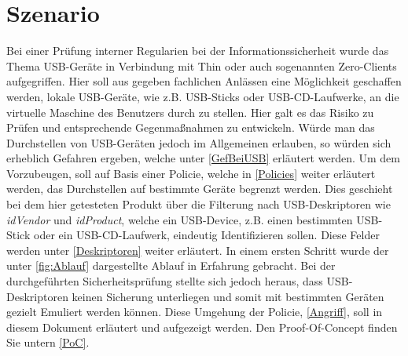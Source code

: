 			\chapter{Szenario}
Bei einer Prüfung interner Regularien bei der Informationssicherheit wurde das Thema USB-Geräte in Verbindung mit Thin oder auch sogenannten Zero-Clients aufgegriffen. Hier soll aus gegeben fachlichen Anlässen eine Möglichkeit geschaffen werden, lokale USB-Geräte, wie z.B. USB-Sticks oder USB-CD-Laufwerke, an die virtuelle Maschine des Benutzers durch zu stellen. Hier galt es das Risiko zu Prüfen und entsprechende Gegenmaßnahmen zu entwickeln. 
Würde man das Durchstellen von USB-Geräten jedoch im Allgemeinen erlauben, so würden sich erheblich Gefahren ergeben, welche unter \ref{GefBeiUSB} erläutert werden. Um dem Vorzubeugen, soll auf Basis einer Policie, welche in \ref{Policies} weiter erläutert werden, das Durchstellen auf bestimmte Geräte begrenzt werden. Dies geschieht bei dem hier getesteten Produkt über die Filterung nach USB-Deskriptoren wie \textit{idVendor} und \textit{idProduct}, welche ein USB-Device, z.B. einen bestimmten USB-Stick oder ein USB-CD-Laufwerk, eindeutig Identifizieren sollen. Diese Felder werden unter \ref{Deskriptoren} weiter erläutert.
In einem ersten Schritt wurde der unter \ref{fig:Ablauf} dargestellte Ablauf in Erfahrung gebracht.
Bei der durchgeführten Sicherheitsprüfung stellte sich jedoch heraus, dass USB-Deskriptoren keinen Sicherung unterliegen und somit mit bestimmten Geräten gezielt Emuliert werden können. Diese Umgehung der Policie, \ref{Angriff}, soll in diesem Dokument erläutert und aufgezeigt werden. Den Proof-Of-Concept finden Sie untern \ref{PoC}.

